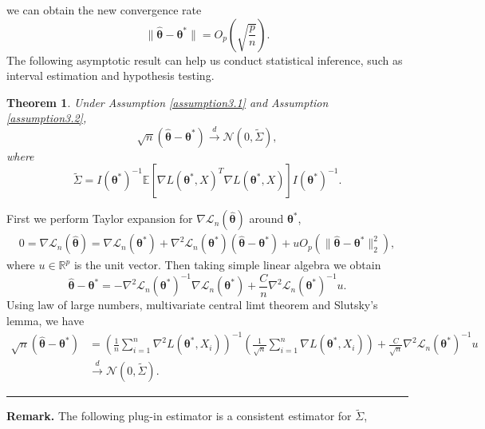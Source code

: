 \documentclass[12pt]{article}
\numberwithin{equation}{section}
\newtheorem{theorem}{Theorem}[section]
\newenvironment{proof}{{\bf Proof:}}{\hfill\rule{2mm}{2mm}}
\begin{document}
we can obtain the new convergence rate
$$
\|\widehat{\boldsymbol{\theta}}-\boldsymbol{\theta}^{*}\|=O_p\left(\sqrt{\frac{p}{n}}\right).
$$
The following asymptotic result can help us conduct statistical inference, such as interval estimation and hypothesis testing.
\begin{theorem}
	Under Assumption \ref{assumption3.1} and Assumption \ref{assumption3.2},
	\begin{equation}
	\sqrt{n}\left(\widehat{\boldsymbol{\theta}}-\boldsymbol{\theta}^{*}\right)\stackrel{d}{\longrightarrow}\mathcal{N}\left(0,\widetilde{\Sigma}\right),
	\end{equation}
	where 
	$$
	\widetilde{\Sigma}=I(\boldsymbol{\theta}^{*})^{-1}\mathbb{E}\left[\nabla L(\boldsymbol{\theta}^{*},X)^{T}\nabla L(\boldsymbol{\theta}^{*},X)\right]I(\boldsymbol{\theta}^{*})^{-1}.
	$$
\end{theorem}
\begin{proof}
	First we perform Taylor expansion for $\nabla\mathcal{L}_n(\widehat{\boldsymbol{\theta}})$ around $\boldsymbol{\theta}^{*}$,
	\begin{align*}
	0=\nabla \mathcal{L}_n(\widehat{\boldsymbol{\theta}})=\nabla\mathcal{L}_n(\boldsymbol{\theta}^{*})+\nabla^2\mathcal{L}_n(\boldsymbol{\theta}^{*})\left(\widehat{\boldsymbol{\theta}}-\boldsymbol{\theta}^{*}\right)+uO_p(\|\widehat{\boldsymbol{\theta}}-\boldsymbol{\theta}^{*}\|_2^2),
	\end{align*}
	where $u\in \mathbb{R}^p$ is the unit vector. Then taking simple linear algebra we obtain
	$$
	\widehat{\boldsymbol{\theta}}-\boldsymbol{\theta}^{*}=-\nabla^2\mathcal{L}_n(\boldsymbol{\theta}^{*})^{-1}\nabla\mathcal{L}_n(\boldsymbol{\theta}^{*})+\frac{C}{n}\nabla^2\mathcal{L}_n(\boldsymbol{\theta}^{*})^{-1}u.
	$$
	Using law of large numbers, multivariate central limt theorem and Slutsky's lemma, we have
	\begin{align*}
	\sqrt{n}\left(\widehat{\boldsymbol{\theta}}-\boldsymbol{\theta}^{*}\right)&=\left(\frac{1}{n}\sum_{i=1}^n\nabla^2 L(\boldsymbol{\theta}^{*},X_i)\right)^{-1}\left(\frac{1}{\sqrt{n}}\sum_{i=1}^n\nabla L(\boldsymbol{\theta}^{*},X_i)\right)+\frac{C}{\sqrt{n}}\nabla^2\mathcal{L}_n(\boldsymbol{\theta}^{*})^{-1}u\\
	&\stackrel{d}{\longrightarrow}\mathcal{N}\left(0,\widetilde{\Sigma}\right).
	\end{align*}
\end{proof}\newline
\textbf{Remark.} The following plug-in estimator is a consistent estimator for $\widetilde{\Sigma}$,
\end{document}
